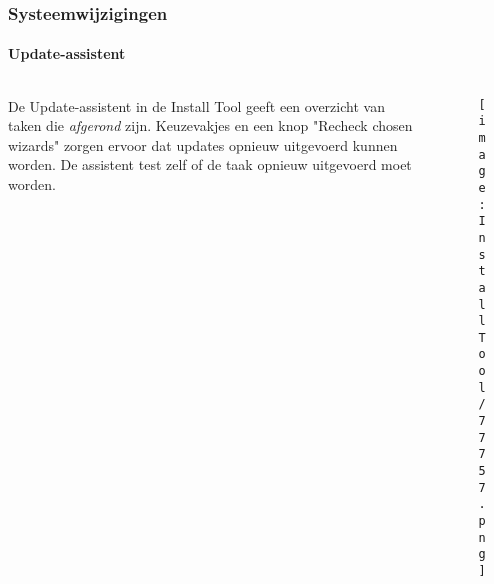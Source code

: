 \begin{frame}[fragile]
	\frametitle{Systeemwijzigingen}
	\framesubtitle{Update-assistent}

	\begin{columns}[T]
		\begin{column}{.5\textwidth}
			De Update-assistent in de Install Tool geeft een overzicht van taken die \textit{afgerond} zijn.
			\newline\newline
			Keuzevakjes en een knop "Recheck chosen wizards" zorgen ervoor dat updates opnieuw uitgevoerd kunnen worden.
			De assistent test zelf of de taak opnieuw uitgevoerd moet worden.
		\end{column}
		\begin{column}{.5\textwidth}
			\begin{figure}\vspace*{-0.5cm}
				\texttt{[image: InstallTool/77757.png]}
			\end{figure}
		\end{column}
	\end{columns}

\end{frame}


